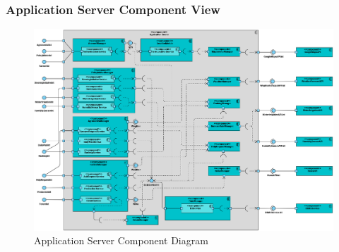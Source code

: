 \documentclass[table, 12pt]{article}
\begin{document}
\subsubsection*{Application Server Component View}
\begin{center}
    \begin{figure}[H]
        \includegraphics[scale=0.45, center]{assets/application-server-component.png}
        \caption{Application Server Component Diagram}
        \label{fig: application_server_component_view}
    \end{figure}
\end{center}
\end{document}
